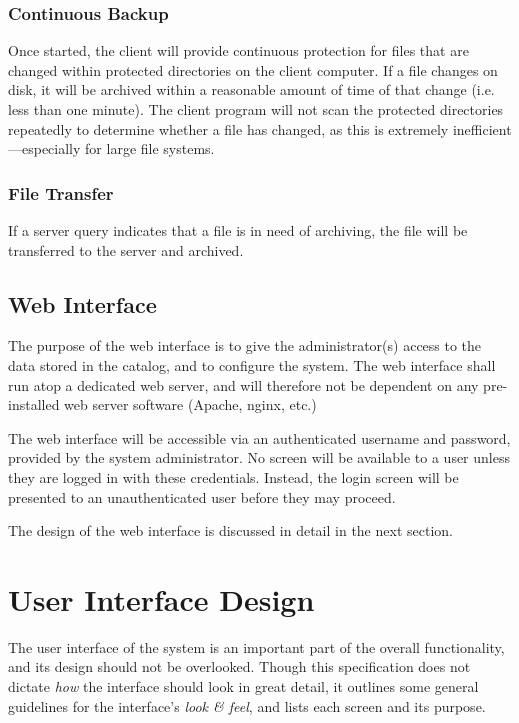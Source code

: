 \subsubsection{Continuous Backup}

Once started, the client will provide continuous protection for files that are
changed within protected directories on the client computer. If a file changes
on disk, it will be archived within a reasonable amount of time of that change
(i.e. less than one minute). The client program will not scan the protected
directories repeatedly to determine whether a file has changed, as this is
extremely inefficient---especially for large file systems.

\subsubsection{File Transfer}

If a server query indicates that a file is in need of archiving, the file will
be transferred to the server and archived.

\subsection{Web Interface}

The purpose of the web interface is to give the administrator(s) access to the
data stored in the catalog, and to configure the system. The web interface
shall run atop a dedicated web server, and will therefore not be dependent on
any pre-installed web server software (Apache, nginx, etc.)

The web interface will be accessible via an authenticated username and
password, provided by the system administrator. No screen will be available to
a user unless they are logged in with these credentials. Instead, the login
screen will be presented to an unauthenticated user before they may proceed.

The design of the web interface is discussed in detail in the next section.

\section{User Interface Design}

The user interface of the system is an important part of the overall
functionality, and its design should not be overlooked. Though this
specification does not dictate \emph{how} the interface should look in great
detail, it outlines some general guidelines for the interface's \emph{look \&
feel}, and lists each screen and its purpose.

